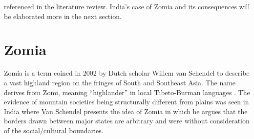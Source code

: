 referenced in the literature review. India's case of Zomia and its consequences will be elaborated more in the next section. 


\section{Zomia}
 Zomia is a term coined in 2002 by Dutch scholar Willem van Schendel to describe a vast highland region on the fringes of South and Southeast Asia. The name derives from Zomi, meaning “highlander” in local Tibeto-Burman languages \citep{van2005geographies}. 
 The evidence of mountain societies being structurally different from plains was seen in India where Van Schendel \citep{van2005geographies} presents the idea of Zomia in which he argues that the borders drawn between major states are arbitrary and were without consideration of the social/cultural boundaries. 
